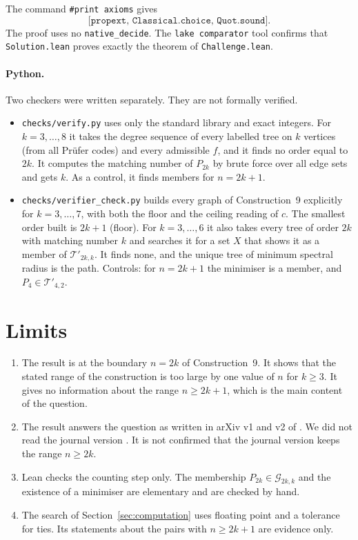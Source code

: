 \documentclass[11pt]{article}
\theoremstyle{definition}
\newcommand{\G}{\mathcal{G}}
\newcommand{\Tp}{\mathcal{T}'}
\begin{document}
The command \texttt{\#print axioms} gives
\[\texttt{[propext, Classical.choice, Quot.sound]}.\]
The proof uses no \texttt{native\_decide}. The \texttt{lake comparator} tool confirms
that \texttt{Solution.lean} proves exactly the theorem of \texttt{Challenge.lean}.

\paragraph{Python.}
Two checkers were written separately. They are not formally verified.
\begin{itemize}
\item \texttt{checks/verify.py} uses only the standard library and exact integers. For
$k = 3,\dots,8$ it takes the degree sequence of every labelled tree on $k$ vertices (from
all Pr\"ufer codes) and every admissible $f$, and it finds no order equal to $2k$. It
computes the matching number of $P_{2k}$ by brute force over all edge sets and gets $k$.
As a control, it finds members for $n = 2k+1$.
\item \texttt{checks/verifier\_check.py} builds every graph of Construction~9 explicitly
for $k = 3,\dots,7$, with both the floor and the ceiling reading of $c$. The smallest
order built is $2k+1$ (floor). For $k = 3,\dots,6$ it also takes every tree of order $2k$
with matching number $k$ and searches it for a set $X$ that shows it as a member of
$\Tp_{2k,k}$. It finds none, and the unique tree of minimum spectral radius is the path.
Controls: for $n = 2k+1$ the minimiser is a member, and $P_4 \in \Tp_{4,2}$.
\end{itemize}

\section{Limits}

\begin{enumerate}
\item The result is at the boundary $n = 2k$ of Construction~9. It shows that the stated
range of the construction is too large by one value of $n$ for $k \ge 3$. It gives no
information about the range $n \ge 2k+1$, which is the main content of the question.
\item The result answers the question as written in arXiv v1 and v2 of \cite{HT}. We did
not read the journal version \cite{HTj}. It is not confirmed that the journal version
keeps the range $n \ge 2k$.
\item Lean checks the counting step only. The membership $P_{2k} \in \G_{2k,k}$ and the
existence of a minimiser are elementary and are checked by hand.
\item The search of Section~\ref{sec:computation} uses floating point and a tolerance
for ties. Its statements about the pairs with $n \ge 2k+1$ are evidence only.
\end{enumerate}
\end{document}
